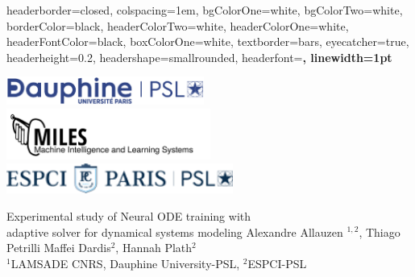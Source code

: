 \documentclass[landscape,a0paper,fontscale=0.285]{baposter} %
\begin{document}
\begin{poster}
{
headerborder=closed, %
colspacing=1em, %
bgColorOne=white, %
bgColorTwo=white, %
borderColor=black, %
headerColorTwo=white, %
headerColorOne=white, %
headerFontColor=black, %
boxColorOne=white, %
textborder=bars, %
eyecatcher=true, %
headerheight=0.2\textheight, %
headershape=smallrounded, %
headerfont=\Large\bf\textsc, %
linewidth=1pt %
}
%
{
  \begin{minipage}{0.2\textwidth}
    \includegraphics[height=2.5em]{dauphine}\\
    \includegraphics[height=4.5em]{logomiles_white}\\[1ex]
    \includegraphics[height=2.7em]{espci}%
  \end{minipage}
}
{{\color{bleutitre}Experimental study of Neural ODE training with\\[0.5ex] adaptive solver
  for dynamical systems modeling}\vspace{1ex}} %
{  Alexandre Allauzen $^{1,2}$, Thiago Petrilli Maffei Dardis$^{2}$, Hannah Plath$^{2}$\\
  $^{1}$LAMSADE CNRS, Dauphine University-PSL, $^{2}$ESPCI-PSL
} %
{} %





\end{poster}
\end{document}
